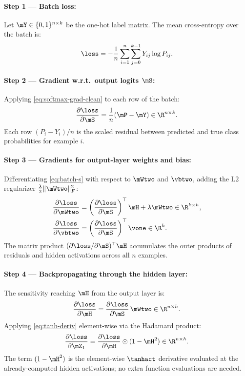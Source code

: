 \documentclass[sigconf,screen,nonacm]{acmart}
\begin{document}
\paragraph{Step 1 --- Batch loss:}
Let $\mY \in \{0,1\}^{n \times k}$ be the one-hot label matrix. The mean cross-entropy over the batch is:
\begin{equation}
    \loss = -\frac{1}{n}\sum_{i=1}^{n}\sum_{j=0}^{k-1} Y_{ij} \log P_{ij}.
    \label{eq:batch-loss}
\end{equation}

\paragraph{Step 2 --- Gradient w.r.t.\ output logits $\mS$:}
Applying \cref{eq:softmax-grad-clean} to each row of the batch:
\begin{equation}
    \frac{\partial \loss}{\partial \mS} = \frac{1}{n}(\mP - \mY) \in \R^{n \times k}.
    \label{eq:dL-dS}
\end{equation}
Each row $(P_i - Y_i)/n$ is the scaled residual between predicted and true class probabilities for example $i$.

\paragraph{Step 3 --- Gradients for output-layer weights and bias:}
Differentiating \cref{eq:batch-s} with respect to $\mWtwo$ and $\vbtwo$, adding the L2 regularizer $\frac{\lambda}{2}\|\mWtwo\|_F^2$:
\begin{align}
    \frac{\partial \loss}{\partial \mWtwo} &= \left(\frac{\partial \loss}{\partial \mS}\right)^\top \mH + \lambda \mWtwo \in \R^{k \times h},
    \label{eq:dL-dW2} \\
    \frac{\partial \loss}{\partial \vbtwo} &= \left(\frac{\partial \loss}{\partial \mS}\right)^\top \vone \in \R^{k}.
    \label{eq:dL-db2}
\end{align}
The matrix product $(\partial\loss/\partial\mS)^\top \mH$ accumulates the outer products of residuals and hidden activations across all $n$ examples.

\paragraph{Step 4 --- Backpropagating through the hidden layer:}
The sensitivity reaching $\mH$ from the output layer is:
\begin{equation}
    \frac{\partial \loss}{\partial \mH} = \frac{\partial \loss}{\partial \mS} \, \mWtwo \in \R^{n \times h}.
    \label{eq:dL-dH}
\end{equation}
Applying \cref{eq:tanh-deriv} element-wise via the Hadamard product:
\begin{equation}
    \frac{\partial \loss}{\partial \mZ_1} = \frac{\partial \loss}{\partial \mH} \odot (1 - \mH^2) \in \R^{n \times h}.
    \label{eq:dL-dZ1}
\end{equation}
The term $(1 - \mH^2)$ is the element-wise $\tanhact$ derivative evaluated at the already-computed hidden activations; no extra function evaluations are needed.
\end{document}
